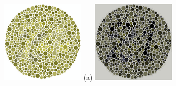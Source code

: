 \documentclass[	12pt, Times, openright, twoside, a4paper, english, brazil]{abntex2}
\begin{document}
\begin{figure}[!htb]
\centering
{\includegraphics[width=\linewidth]{jleeoriginal.png}}
(a)
\endminipage\hfill
{}
\centering
{\includegraphics[width=\linewidth]{jleecomequalizacao.png}}

\end{figure}
\end{document}
